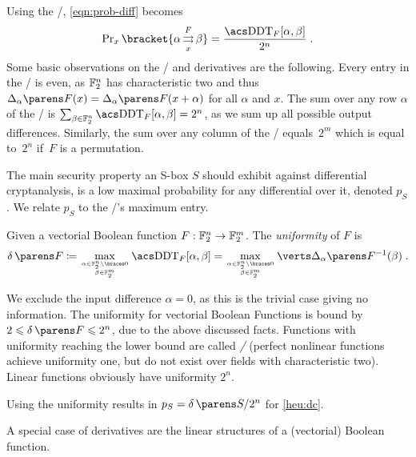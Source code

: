 Using the \DDT/, \cref{eqn:prob-diff} becomes
\begin{equation*}
    \Prob_x\bracket{\propDiff{\alpha}{F}{x}{\beta}} = \frac{\text{\DDTs/}_F[\alpha, \beta]}{2^n}\;.
\end{equation*}
Some basic observations on the \DDT/ and derivatives are the following.
Every entry in the \DDT/ is even, as $\mathbb{F}_2^n$ has characteristic two and thus $\derive{\alpha}{F}(x) = \derive{\alpha}{F}(x+\alpha)$ for all $\alpha$ and $x$.
The sum over any row $\alpha$ of the \DDT/ is $\sum_{\beta \in \F_2^n} \text{\DDTs/}_F[\alpha, \beta] = 2^n$, as we sum up all possible output differences.
Similarly, the sum over any column of the \DDT/ equals~$2^m$ which is equal to~$2^n$ if~$F$ is a permutation.

The main security property an S-box $S$ should exhibit against differential cryptanalysis, is a low maximal probability for any differential over it, denoted $p_S$.
We relate $p_S$ to the \DDT/'s maximum entry.
\begin{definition}[Uniformity]
    Given a vectorial Boolean function $F : \mathbb{F}_2^n \to \mathbb{F}_2^m$.
    The \emph{uniformity} of $F$ is
    \begin{equation*}
        \uniformity{F} \coloneqq \max_{\tower{\alpha \in \F_2^n \setminus \set{0}}{\beta \in \F_2^m}} \text{\DDTs/}_F[\alpha, \beta] = \max_{\tower{\alpha \in \F_2^n \setminus \set{0}}{\beta \in \F_2^m}} \abs{\derive{\alpha}{F}^{-1}(\beta)}\;.
    \end{equation*}
\end{definition}
We exclude the input difference $\alpha = 0$, as this is the trivial case giving no information.
The uniformity for vectorial Boolean Functions is bound by $2 \leqslant \uniformity{F} \leqslant 2^n$, due to the above discussed facts.
Functions with uniformity reaching the lower bound are called \emph{\APN/} (perfect nonlinear functions achieve uniformity one, but do not exist over fields with characteristic two).
Linear functions obviously have uniformity $2^n$.

Using the uniformity results in $p_S = \uniformity{S}/2^n$ for \cref{heu:dc}.

A special case of derivatives are the linear structures of a (vectorial) Boolean function.


